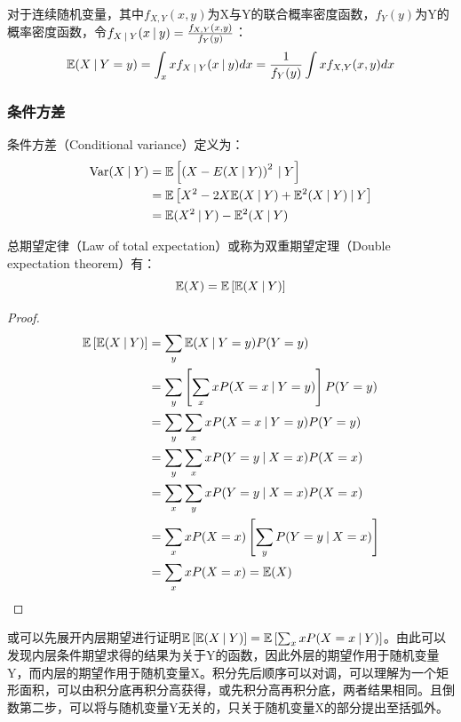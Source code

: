 \documentclass[11pt]{article}
\begin{document}
对于连续随机变量，其中$f_{X,Y}(x,y)$为X与Y的联合概率密度函数，$f_Y(y)$为Y的概率密度函数，令$f_{X\:\vert\: Y}(x\:\vert\: y) = \frac{f_{X,Y}(x,y)}{f_Y(y)}$：
\begin{equation*}
    \mathbb{E}(X\:\vert\: Y=y) = \int_x x f_{X\:\vert\: Y}(x\:\vert\: y) dx = \frac{1}{f_Y(y)} \int x f_{X,Y}(x,y) dx
\end{equation*}

\subsubsection{条件方差}

条件方差（Conditional variance）定义为：
\begin{align*}
    \operatorname{Var}(X\:\vert\: Y) &= \mathbb{E} \left[\left( X-E(X\:\vert\: Y) \right)^2 \:\vert\: Y \right] \\
    &= \mathbb{E} \left[ X^2 - 2X\mathbb{E}(X\:\vert\: Y) + \mathbb{E}^2(X\:\vert\: Y) \:\vert\: Y \right] \\
    &= \mathbb{E} (X^2\:\vert\: Y) - \mathbb{E}^2(X\:\vert\: Y)
\end{align*}

\begin{proposition}
    总期望定律（Law of total expectation）或称为双重期望定理（Double expectation theorem）有：
    \begin{equation*}
        \mathbb{E}(X) = \mathbb{E}\left[ \mathbb{E}(X\:\vert\: Y) \right]
    \end{equation*}
    
    \begin{proof}
        \begin{align*}
            \mathbb{E}\left[ \mathbb{E}(X\:\vert\: Y) \right]
            &= \sum_y \mathbb{E}(X\:\vert\: Y=y) P(Y=y)\\
            &= \sum_y \left[ \sum_x x P(X=x\:\vert\: Y=y) \right] P(Y=y) \\
            &= \sum_y \sum_x x P(X=x\:\vert\: Y=y) P(Y=y) \\
            &= \sum_y \sum_x x P(Y=y\:\vert\: X=x) P(X=x) \\
            &= \sum_x \sum_y x P(Y=y\:\vert\: X=x) P(X=x) \\
            &= \sum_x x P(X=x) \left[ \sum_y P(Y=y\:\vert\: X=x)\right] \\
            &= \sum_x x P(X=x) = \mathbb{E}(X)
        \end{align*}
    \end{proof}
\end{proposition}

\begin{remark}
    或可以先展开内层期望进行证明$\mathbb{E}\left[ \mathbb{E}(X\:\vert\: Y) \right] = \mathbb{E}\left[ \sum_x x P(X=x\:\vert\: Y) \right]$。由此可以发现内层条件期望求得的结果为关于Y的函数，因此外层的期望作用于随机变量Y，而内层的期望作用于随机变量X。积分先后顺序可以对调，可以理解为一个矩形面积，可以由积分底再积分高获得，或先积分高再积分底，两者结果相同。且倒数第二步，可以将与随机变量Y无关的，只关于随机变量X的部分提出至括弧外。
\end{remark}
\end{document}

